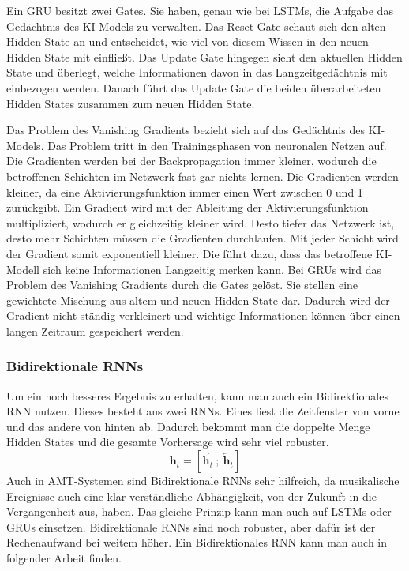 Ein GRU besitzt zwei Gates.
Sie haben, genau wie bei LSTMs, die Aufgabe das Gedächtnis des KI-Models zu verwalten.
Das Reset Gate schaut sich den alten Hidden State an und entscheidet,
wie viel von diesem Wissen in den neuen Hidden State mit einfließt.
Das Update Gate hingegen sieht den aktuellen Hidden State und überlegt,
welche Informationen davon in das Langzeitgedächtnis mit einbezogen werden.
Danach führt das Update Gate die beiden überarbeiteten Hidden States zusammen zum neuen Hidden State.

Das Problem des Vanishing Gradients bezieht sich auf das Gedächtnis des KI-Models.
Das Problem tritt in den Trainingsphasen von neuronalen Netzen auf.
Die Gradienten werden bei der Backpropagation immer kleiner,
wodurch die betroffenen Schichten im Netzwerk fast gar nichts lernen.
Die Gradienten werden kleiner, da eine Aktivierungsfunktion immer einen Wert zwischen 0 und 1 zurückgibt.
Ein Gradient wird mit der Ableitung der Aktivierungsfunktion multipliziert, wodurch er gleichzeitig kleiner wird.
Desto tiefer das Netzwerk ist, desto mehr Schichten müssen die Gradienten durchlaufen.
Mit jeder Schicht wird der Gradient somit exponentiell kleiner.
Die führt dazu, dass das betroffene KI-Modell sich keine Informationen Langzeitig merken kann.
Bei GRUs wird das Problem des Vanishing Gradients durch die Gates gelöst.
Sie stellen eine gewichtete Mischung aus altem und neuen Hidden State dar.
Dadurch wird der Gradient nicht ständig verkleinert
und wichtige Informationen können über einen langen Zeitraum gespeichert werden.

\subsubsection{Bidirektionale RNNs}
Um ein noch besseres Ergebnis zu erhalten, kann man auch ein Bidirektionales RNN nutzen.
Dieses besteht aus zwei RNNs.
Eines liest die Zeitfenster von vorne und das andere von hinten ab.
Dadurch bekommt man die doppelte Menge Hidden States und die gesamte Vorhersage wird sehr viel robuster.
\[
\mathbf{h}_t = \left[ \overrightarrow{\mathbf{h}}_t \ ;\ \overleftarrow{\mathbf{h}}_t \right]
\]
Auch in AMT-Systemen sind Bidirektionale RNNs sehr hilfreich,
da musikalische Ereignisse auch eine klar verständliche Abhängigkeit, von der Zukunft in die Vergangenheit aus, haben.
Das gleiche Prinzip kann man auch auf LSTMs oder GRUs einsetzen.
Bidirektionale RNNs sind noch robuster, aber dafür ist der Rechenaufwand bei weitem höher.
Ein Bidirektionales RNN kann man auch in folgender Arbeit finden.
\cite{hawthorne2017onsets}

